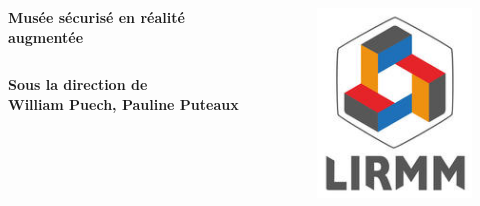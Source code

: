 \documentclass{beamer}
\begin{document}
\begin{frame}[t]
\begin{columns}[t]
\begin{column}{.8\linewidth}
\begin{block}{\Huge \centering \textbf{Musée sécurisé en réalité augmentée}}
\begin{columns}[t]
                        \begin{column}{.5\linewidth}
                            \begin{center}
                                \textbf{Sous la direction de\\William Puech, Pauline Puteaux}
                            \end{center}
                        \end{column}
                    \end{columns}
                \end{block}
            \end{column}

            \begin{column}{.1\linewidth}
                \begin{figure}[t]
                    \includegraphics[width=\linewidth]{rsc/logo_lirmm.png}
                \end{figure}
            \end{column}
        \end{columns}


\end{frame}
\end{document}
